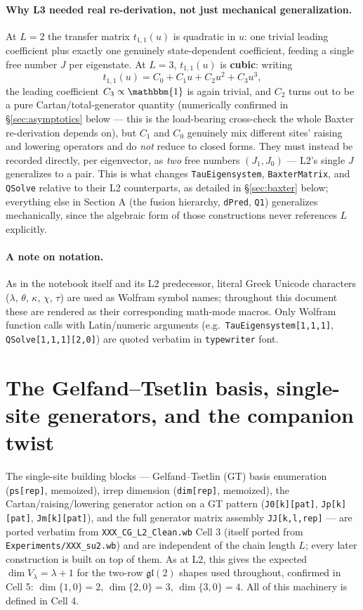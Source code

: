 \documentclass[11pt]{article}
\begin{document}
\paragraph{Why L3 needed real re-derivation, not just mechanical generalization.} At $L=2$ the
transfer matrix $t_{1,1}(u)$ is quadratic in $u$: one trivial leading coefficient plus exactly one
genuinely state-dependent coefficient, feeding a single free number $J$ per eigenstate. At $L=3$,
$t_{1,1}(u)$ is \textbf{cubic}: writing
\[
  t_{1,1}(u) = C_0 + C_1 u + C_2 u^2 + C_3 u^3,
\]
the leading coefficient $C_3\propto\mathbbm{1}$ is again trivial, and $C_2$ turns out to be a pure
Cartan/total-generator quantity (numerically confirmed in \S\ref{sec:asymptotics} below --- this is
the load-bearing cross-check the whole Baxter re-derivation depends on), but $C_1$ and $C_0$
genuinely mix different sites' raising and lowering operators and do \emph{not} reduce to closed
forms. They must instead be recorded directly, per eigenvector, as \emph{two} free numbers $(J_1,J_0)$
--- L2's single $J$ generalizes to a pair. This is what changes \texttt{TauEigensystem},
\texttt{BaxterMatrix}, and \texttt{QSolve} relative to their L2 counterparts, as detailed in
\S\ref{sec:baxter} below; everything else in Section A (the fusion hierarchy, \texttt{dPred},
\texttt{Q1}) generalizes mechanically, since the algebraic form of those constructions never
references $L$ explicitly.

\paragraph{A note on notation.} As in the notebook itself and its L2 predecessor, literal Greek
Unicode characters ($\lambda$, $\theta$, $\kappa$, $\chi$, $\tau$) are used as Wolfram symbol names;
throughout this document these are rendered as their corresponding math-mode macros. Only Wolfram
function calls with Latin/numeric arguments (e.g.\ \texttt{TauEigensystem[1,1,1]},
\texttt{QSolve[1,1,1][2,0]}) are quoted verbatim in \texttt{typewriter} font.

\section{The Gelfand--Tsetlin basis, single-site generators, and the companion twist}
\label{sec:gt}

The single-site building blocks --- Gelfand--Tsetlin (GT) basis enumeration (\texttt{ps[rep]},
memoized), irrep dimension (\texttt{dim[rep]}, memoized), the Cartan/raising/lowering generator
action on a GT pattern (\texttt{J0[k][pat]}, \texttt{Jp[k][pat]}, \texttt{Jm[k][pat]}), and the full
generator matrix assembly \texttt{JJ[k,l,rep]} --- are ported verbatim from \texttt{XXX\_CG\_L2\_Clean.wb}
Cell 3 (itself ported from \texttt{Experiments/XXX\_su2.wb}) and are independent of the chain length
$L$; every later construction is built on top of them. As at L2, this gives the expected
$\dim V_\lambda=\lambda+1$ for the two-row $\mathfrak{gl}(2)$ shapes used throughout, confirmed in
Cell 5: $\dim\{1,0\}=2$, $\dim\{2,0\}=3$, $\dim\{3,0\}=4$. All of this machinery is defined in Cell 4.
\end{document}
